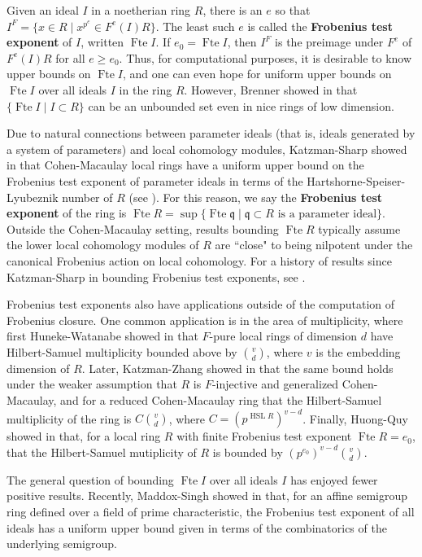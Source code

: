 \documentclass{amsproc}
\theoremstyle{definition}
\theoremstyle{remark}
\numberwithin{equation}{section}
\newcommand{\fq}{\mathfrak{q}}
\newcommand{\fte}{\operatorname{Fte}}
\newcommand{\HSL}{\operatorname{HSL}}
\begin{document}
Given an ideal $I$ in a noetherian ring $R$, there is an $e$ so that $I^F = \{ x \in R \mid x^{p^e} \in F^e(I)R\}$. The least such $e$ is called the \textbf{Frobenius test exponent} of $I$, written $\fte I$. If $e_0 = \fte I$, then $I^F$ is the preimage under $F^e$ of $F^e(I)R$ for all $e \ge e_0$. Thus, for computational purposes, it is desirable to know upper bounds on $\fte I$, and one can even hope for uniform upper bounds on $\fte I$ over all ideals $I$ in the ring $R$. However, Brenner showed in \cite{Bre06} that $\{\fte I \mid I \subset R \}$ can be an unbounded set even in nice rings of low dimension. 

Due to natural connections between parameter ideals (that is, ideals generated by a system of parameters) and local cohomology modules, Katzman-Sharp showed in \cite[Thm. 2.4]{KS06} that Cohen-Macaulay local rings have a uniform upper bound on the Frobenius test exponent of parameter ideals in terms of the Hartshorne-Speiser-Lyubeznik number of $R$ (see ). For this reason, we say the \textbf{Frobenius test exponent} of the ring is $\fte R = \sup\{\fte \fq \mid \fq \subset R \text{ is a parameter ideal}\}$. Outside the Cohen-Macaulay setting, results bounding $\fte R$ typically assume the lower local cohomology modules of $R$ are ``close" to being nilpotent under the canonical Frobenius action on local cohomology. For a history of results since Katzman-Sharp in bounding Frobenius test exponents, see .  

Frobenius test exponents also have applications outside of the computation of Frobenius closure. One common application is in the area of multiplicity, where first Huneke-Watanabe showed in \cite{HW15} that $F$-pure local rings of dimension $d$ have Hilbert-Samuel multiplicity bounded above by $\binom{v}{d}$, where $v$ is the embedding dimension of $R$. Later, Katzman-Zhang showed in \cite{KZ19} that the same bound holds under the weaker assumption that $R$ is $F$-injective and generalized Cohen-Macaulay, and for a reduced Cohen-Macaulay ring that the Hilbert-Samuel multiplicity of the ring is $C\binom{v}{d}$, where $C = (p^{\HSL R})^{v-d}$. Finally, Huong-Quy showed in \cite{HQ20} that, for a local ring $R$ with finite Frobenius test exponent $\fte R = e_0$, that the Hilbert-Samuel mutiplicity of $R$ is bounded by $(p^{e_0})^{v-d}\binom{v}{d}$.

The general question of bounding $\fte I$ over all ideals $I$ has enjoyed fewer positive results. Recently, Maddox-Singh showed in \cite{MS25} that, for an affine semigroup ring defined over a field of prime characteristic, the Frobenius test exponent of all ideals has a uniform upper bound given in terms of the combinatorics of the underlying semigroup. 
\end{document}
